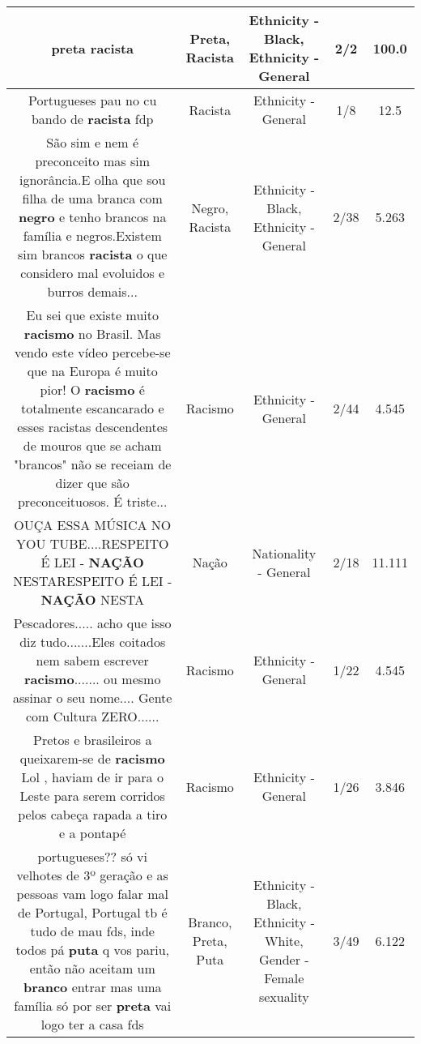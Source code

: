\documentclass[11pt]{article}
\newlength\mylength
\begin{document}
\begin{center}
\begin{longtable}{|C{.65\mylength}|C{.30\mylength}|C{.12\mylength}|C{.12\mylength}|C{.12\mylength}|}
  \small preta racista\normalsize   & Preta, Racista & Ethnicity - Black, Ethnicity - General & 2/2 & 100.0 \\  \hline
  \small Portugueses pau no cu bando de \textbf{racista} fdp\normalsize   & Racista & Ethnicity - General & 1/8 & 12.5 \\  \hline
  \small São sim e nem é preconceito mas sim ignorância.E olha que sou filha de uma branca com \textbf{negro} e tenho brancos na família e negros.Existem sim brancos \textbf{racista} o que considero mal evoluidos e burros demais...\normalsize   & Negro, Racista & Ethnicity - Black, Ethnicity - General & 2/38 & 5.263 \\  \hline
  \small Eu sei que existe muito \textbf{racismo} no Brasil. Mas vendo este vídeo percebe-se que na Europa é muito pior! O \textbf{racismo} é totalmente escancarado e esses racistas descendentes de mouros que se acham "brancos" não se receiam de dizer que são preconceituosos. É triste...\normalsize   & Racismo & Ethnicity - General & 2/44 & 4.545 \\  \hline
  \small OUÇA ESSA MÚSICA NO YOU TUBE....RESPEITO É LEI - \textbf{NAÇÃO} NESTARESPEITO É LEI - \textbf{NAÇÃO} NESTA\normalsize   & Nação & Nationality - General & 2/18 & 11.111 \\  \hline
  \small Pescadores..... acho que isso diz tudo.......Eles coitados nem sabem escrever \textbf{racismo}.......  ou mesmo assinar o seu nome.... Gente com Cultura ZERO......\normalsize   & Racismo & Ethnicity - General & 1/22 & 4.545 \\  \hline
  \small Pretos e brasileiros a queixarem-se de \textbf{racismo} Lol , haviam de ir para o Leste para serem corridos pelos cabeça rapada a tiro e a pontapé\normalsize   & Racismo & Ethnicity - General & 1/26 & 3.846 \\  \hline
  \small portugueses?? só vi velhotes de 3º geração e as pessoas vam logo falar mal de Portugal, Portugal tb é tudo de mau fds, inde todos pá \textbf{puta} q vos pariu, então não aceitam um \textbf{branco} entrar mas uma família só por ser \textbf{preta} vai logo ter a casa fds\normalsize   & Branco, Preta, Puta & Ethnicity - Black, Ethnicity - White, Gender - Female sexuality & 3/49 & 6.122 \\  \hline

\end{longtable}
\end{center}
\end{document}
